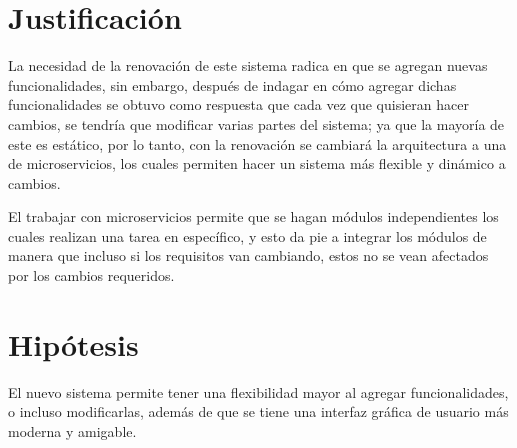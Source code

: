 \section{Justificación} \label{justificacion}

    La necesidad de la renovación de este sistema radica en que se agregan nuevas funcionalidades, sin embargo, después de indagar en cómo agregar dichas funcionalidades se obtuvo como respuesta que cada vez que quisieran hacer cambios, se tendría que modificar varias partes del sistema; ya que la mayoría de este es estático, por lo tanto, con la renovación se cambiará la arquitectura a una de microservicios, los cuales permiten hacer un sistema más flexible y dinámico a cambios.
    
    El trabajar con microservicios permite que se hagan módulos independientes los cuales realizan una tarea en específico, y esto da pie a integrar los módulos de manera que incluso si los requisitos van cambiando, estos no se vean afectados por los cambios requeridos.

\section{Hipótesis} \label{hipotesis}

    El nuevo sistema permite tener una flexibilidad mayor al agregar funcionalidades, o incluso modificarlas, además de que se tiene una interfaz gráfica de usuario más moderna y amigable.